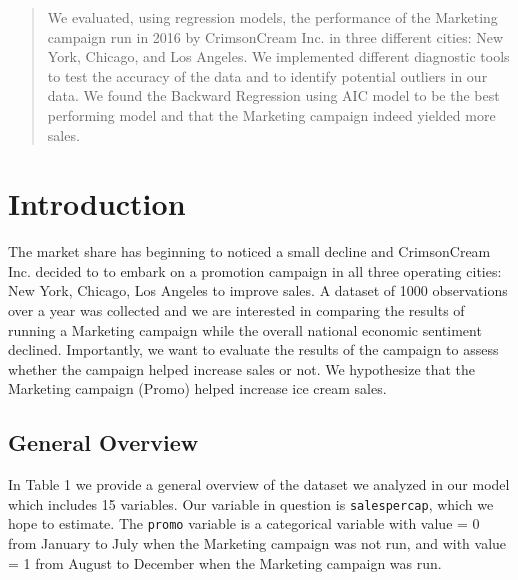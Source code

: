 \documentclass[10pt]{article}
\begin{document}
\maketitle


\begin{abstract}

\noindent We evaluated, using regression models, the performance of the Marketing campaign run in 2016 by CrimsonCream Inc. in three different cities: New York, Chicago, and Los Angeles. We implemented different diagnostic tools to test the accuracy of the data and to identify potential outliers in our data. We found the Backward Regression using AIC model to be the best performing model and that the Marketing campaign indeed yielded more sales. 
\end{abstract}

\tableofcontents

\section{Introduction}

The market share has beginning to noticed a small decline and CrimsonCream Inc. decided to to embark on a promotion campaign in all three operating cities: New York, Chicago, Los Angeles to improve sales. A dataset of 1000 observations over a year was collected and we are interested in comparing the results of running a Marketing campaign while the overall national economic sentiment declined. Importantly, we want to evaluate the results of the campaign to assess whether the campaign helped increase sales or not. We hypothesize that the Marketing campaign (Promo) helped increase ice cream sales.  

\subsection{General Overview}

In Table 1 we provide a general overview of the dataset we analyzed in our model which includes 15 variables. Our variable in question is {\tt salespercap}, which we hope to estimate. The {\tt promo} variable is a categorical variable with value = 0 from January to July when the Marketing campaign was not run, and with value = 1 from August to December when the Marketing campaign was run. 
\end{document}
